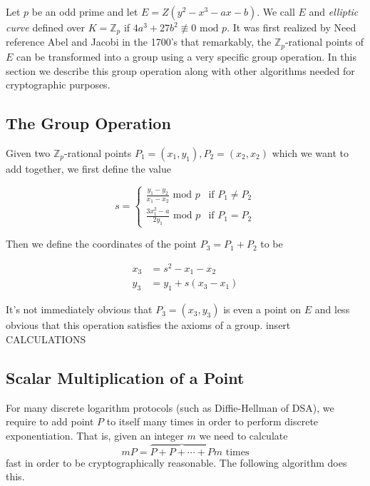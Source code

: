 

Let $p$ be an odd prime and let $E = Z( y^2 - x^3 - ax - b)$. We call $E$ and \textit{elliptic curve} defined over $K = \mathbb{Z}_p$ if $4a^3 + 27b^2 \not\equiv 0 \text{ mod } p$. It was first realized by {\color{red}Need reference} Abel and Jacobi in the 1700's that remarkably, the $\mathbb{Z}_p$-rational points of $E$ can be transformed into a group using a very specific group operation. In this section we describe this group operation along with other algorithms needed for cryptographic purposes. 

\subsection{The Group Operation}  

Given two $\mathbb{Z}_p$-rational points $P_1 = (x_1,y_1),P_2=(x_2,x_2)$ which we want to add together, we first define the value 

$$ s =
\begin{cases}
\frac{y_1 - y_2}{x_1 - x_2} \text{ mod } p 	&\text{if } P_1 \neq P_2 \\
\frac{3x_1^2 - a}{2y_1} 	\text{ mod } p	&\text{if } P_1 = P_2 
\end{cases} 
$$ 

Then we define the coordinates of the point $P_3 = P_1 + P_2 $ to be 

\begin{align*}
	x_3 &= s^2 - x_1 - x_2  \\ 
	y_3 &= y_1 + s(x_3 - x_1) 
\end{align*}

It's not immediately obvious that $P_3 = (x_3,y_3)$ is even a point on $E$ and less obvious that this operation satisfies the axioms of a group. {\color{blue} insert  CALCULATIONS} 

\subsection{Scalar Multiplication of a Point}

For many discrete logarithm protocols (such as Diffie-Hellman of DSA), we require to add point $P$ to itself many times in order to perform discrete exponentiation. That is, given an integer $m$ we need to calculate $$mP = \overbrace{P + P + \cdots + P}{m \text{ times}}$$ fast in order to be cryptographically reasonable. The following algorithm does this.

